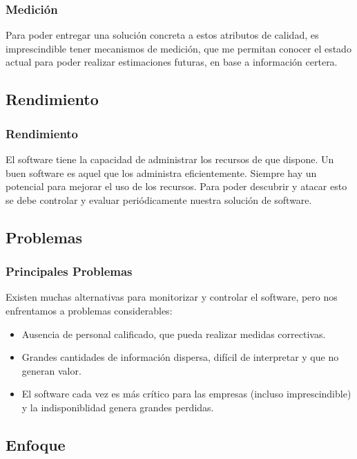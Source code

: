 \documentclass[12pt]{beamer}
\begin{document}
\begin{frame}
 \frametitle{Medición}
 Para poder entregar una solución concreta a estos atributos de calidad, es imprescindible tener mecanismos de medición, que me permitan conocer el estado actual para poder realizar estimaciones futuras, en base a información certera.
\end{frame}


\subsection{Rendimiento}

\begin{frame}
 \frametitle{Rendimiento}
 El software tiene la capacidad de administrar los recursos de que dispone. Un buen software es aquel que los administra eficientemente.
 \newline
 Siempre hay un potencial para mejorar el uso de los recursos. Para poder descubrir y atacar esto se debe controlar y evaluar periódicamente nuestra solución de software.
\end{frame}


\subsection{Problemas}

\begin{frame}
 \frametitle{Principales Problemas}
 Existen muchas alternativas para monitorizar y controlar el software, pero nos enfrentamos a problemas considerables:
 \begin{itemize}
  \item<2-> Ausencia de personal calificado, que pueda realizar medidas correctivas.
  \item<3-> Grandes cantidades de información dispersa, difícil de interpretar y que no generan valor.
  \item<4-> El software cada vez es más crítico para las empresas (incluso imprescindible) y la indisponiblidad genera grandes perdidas.
 \end{itemize}
\end{frame}


\subsection{Enfoque}
\end{document}
